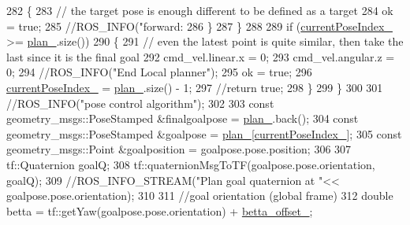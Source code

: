 \begin{DoxyCode}
282             \{
283                 \textcolor{comment}{// the target pose is enough different to be defined as a target}
284                 ok = \textcolor{keyword}{true};
285                 \textcolor{comment}{//ROS\_INFO("forward: %
286             \}
287         \}
288 
289         \textcolor{keywordflow}{if} (\hyperlink{classcl__move__base__z_1_1forward__local__planner_1_1ForwardLocalPlanner_af4019077a7661d10957cca16222547c2}{currentPoseIndex\_} >= \hyperlink{classcl__move__base__z_1_1forward__local__planner_1_1ForwardLocalPlanner_a929e5d0a9db3027810beb658a2343560}{plan\_}.size())
290         \{
291             \textcolor{comment}{// even the latest point is quite similar, then take the last since it is the final goal}
292             cmd\_vel.linear.x = 0;
293             cmd\_vel.angular.z = 0;
294             \textcolor{comment}{//ROS\_INFO("End Local planner");}
295             ok = \textcolor{keyword}{true};
296             \hyperlink{classcl__move__base__z_1_1forward__local__planner_1_1ForwardLocalPlanner_af4019077a7661d10957cca16222547c2}{currentPoseIndex\_} = \hyperlink{classcl__move__base__z_1_1forward__local__planner_1_1ForwardLocalPlanner_a929e5d0a9db3027810beb658a2343560}{plan\_}.size() - 1;
297             \textcolor{comment}{//return true;}
298         \}
299     \}
300 
301     \textcolor{comment}{//ROS\_INFO("pose control algorithm");}
302 
303     \textcolor{keyword}{const} geometry\_msgs::PoseStamped &finalgoalpose = \hyperlink{classcl__move__base__z_1_1forward__local__planner_1_1ForwardLocalPlanner_a929e5d0a9db3027810beb658a2343560}{plan\_}.back();
304     \textcolor{keyword}{const} geometry\_msgs::PoseStamped &goalpose = \hyperlink{classcl__move__base__z_1_1forward__local__planner_1_1ForwardLocalPlanner_a929e5d0a9db3027810beb658a2343560}{plan\_}[\hyperlink{classcl__move__base__z_1_1forward__local__planner_1_1ForwardLocalPlanner_af4019077a7661d10957cca16222547c2}{currentPoseIndex\_}];
305     \textcolor{keyword}{const} geometry\_msgs::Point &goalposition = goalpose.pose.position;
306 
307     tf::Quaternion goalQ;
308     tf::quaternionMsgToTF(goalpose.pose.orientation, goalQ);
309     \textcolor{comment}{//ROS\_INFO\_STREAM("Plan goal quaternion at "<< goalpose.pose.orientation);}
310 
311     \textcolor{comment}{//goal orientation (global frame)}
312     \textcolor{keywordtype}{double} betta = tf::getYaw(goalpose.pose.orientation) + \hyperlink{classcl__move__base__z_1_1forward__local__planner_1_1ForwardLocalPlanner_a935db3e785e3276d42b34d58011e793c}{betta\_offset\_};
}
\end{DoxyCode}
